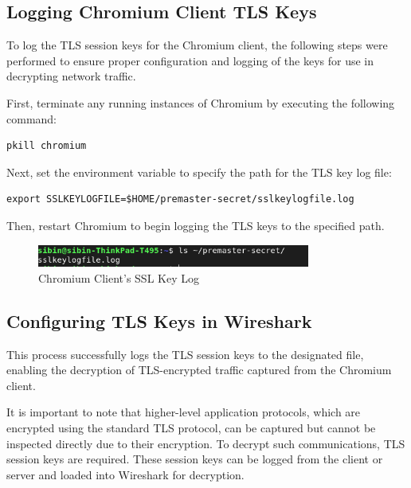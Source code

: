\subsection{Logging Chromium Client TLS Keys}
To log the TLS session keys for the Chromium client, the following steps were performed to ensure proper configuration and logging of the keys for use in decrypting network traffic.

First, terminate any running instances of Chromium by executing the following command:

\begin{lstlisting}
pkill chromium
\end{lstlisting}

Next, set the environment variable to specify the path for the TLS key log file:

\begin{lstlisting}
export SSLKEYLOGFILE=$HOME/premaster-secret/sslkeylogfile.log
\end{lstlisting}

Then, restart Chromium to begin logging the TLS keys to the specified path.

\begin{figure}[h!]
    \centering
    \includegraphics[width=0.8\textwidth]{implementation/sslkeylog.png}
    \caption{Chromium Client's SSL Key Log}
    \label{fig:chromiumssl}
\end{figure}

\subsection{Configuring TLS Keys in Wireshark}

This process successfully logs the TLS session keys to the designated file, enabling the decryption of TLS-encrypted traffic captured from the Chromium client.

It is important to note that higher-level application protocols, which are encrypted using the standard TLS protocol, can be captured but cannot be inspected directly due to their encryption. To decrypt such communications, TLS session keys are required. These session keys can be logged from the client or server and loaded into Wireshark for decryption.


